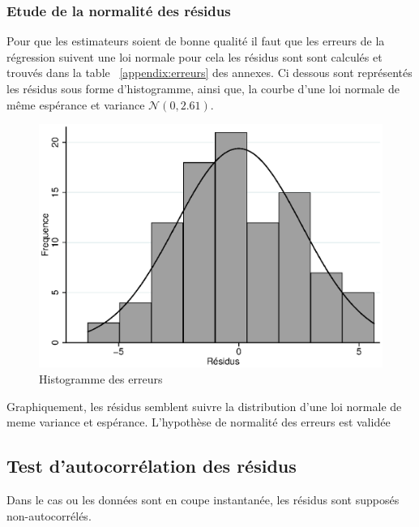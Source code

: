 \documentclass{article}
\begin{document}
\subsubsection{Etude de la normalité des résidus}
Pour que les estimateurs soient de bonne qualité il faut que les erreurs de la régression suivent une loi normale pour cela les résidus sont sont calculés 
et trouvés dans la table ~\ref{appendix:erreurs} des annexes. Ci dessous sont représentés les résidus sous forme d'histogramme, ainsi que, la courbe d'une 
loi normale de même espérance et variance $\mathcal{N}(0,2.61)$.
\begin{figure}[H]
	\centering
	\includegraphics[scale=.6]{Graph.eps}
    \caption{Histogramme des erreurs}
	\label{fig:histogrammeErreur}
\end{figure}
Graphiquement, les résidus semblent suivre la distribution d'une loi normale de meme variance et espérance. L'hypothèse de normalité des erreurs est validée
\subsection{Test d'autocorrélation des résidus}
Dans le cas ou les données sont en coupe instantanée, les résidus sont supposés non-autocorrélés.
\end{document}
